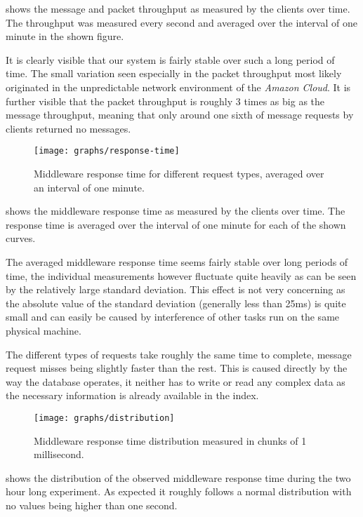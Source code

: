 \documentclass[a4paper, oneside]{csthesis}
\begin{document}
	 shows the message and packet throughput as measured by the clients over time.
	The throughput was measured every second and averaged over the interval of one minute in the shown figure.
	
	It is clearly visible that our system is fairly stable over such a long period of time. The small variation
	seen especially in the packet throughput most likely originated in the unpredictable network environment
	of the {\it Amazon Cloud}. It is further visible that the packet throughput is roughly 3 times as
	big as the message throughput, meaning that only around one sixth of message requests by clients
	returned no messages.
    
    \begin{figure}[ht]
    \centering
        \texttt{[image: graphs/response-time]}
        \caption{Middleware response time for different request types, averaged over an interval of one minute.}
        \label{fig:response-time}
    \end{figure}
    
	 shows the middleware response time as measured by the clients over time.
	The response time is averaged over the interval of one minute for each of the shown curves.
	
	The averaged middleware response time seems fairly stable over long periods of time, the individual
	measurements however fluctuate quite heavily as can be seen by the relatively large standard deviation.
	This effect is not very concerning as the absolute value of the standard deviation (generally less than
	25ms) is quite small and can easily be caused by interference of other tasks run on the same physical
	machine.
	
	The different types of requests take roughly the same time to complete, message request misses being
	slightly faster than the rest. This is caused directly by the way the database operates, it neither has
	to write or read any complex data as the necessary information is already available in the index. 
	
	\begin{figure}[ht]
    \centering
        \texttt{[image: graphs/distribution]}
        \caption{Middleware response time distribution measured in chunks of 1 millisecond.}
        \label{fig:distribution}
    \end{figure}
    
     shows the distribution of the observed middleware response time during
    the two hour long experiment. As expected it roughly follows a normal distribution with no
    values being higher than one second.
\end{document}
